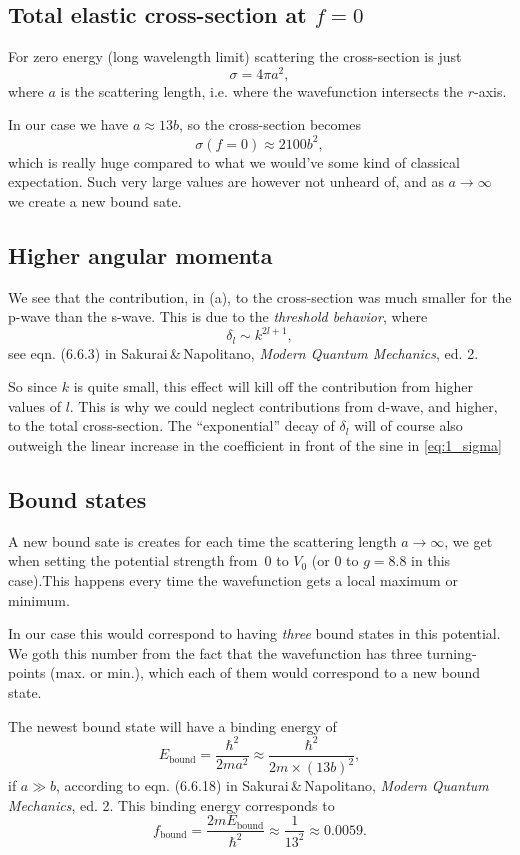 \documentclass[11pt,letter, swedish, english
]{article}
\begin{document}
\subsection{Total elastic cross-section at $f=0$}
For zero energy (long wavelength limit) scattering the cross-section
is just
\begin{equation}
\sigma=4\pi a^2,
\end{equation}
where $a$ is the scattering length, i.e. where the
wavefunction intersects the $r$-axis. 

In our case we have $a\approx 13b$, so the cross-section becomes
\begin{equation}
\sigma(f{=}0) \approx 2100b^2,
\end{equation}
which is really huge compared to what we would've some kind of
classical expectation. Such very large values are however not unheard
of, and as $a\to\infty$ we create a new bound sate.

\subsection{Higher angular momenta}
We see that the contribution, in (a), to the cross-section was much
smaller for the p-wave than the s-wave. This is due to the
\emph{threshold behavior}, where
\begin{equation}
\delta_l\sim k^{2l+1},
\end{equation}
see eqn. (6.6.3) in Sakurai\,\&\,Napolitano, \textit{Modern
  Quantum Mechanics}, ed. 2. 

So since $k$ is quite small, this effect will kill off the
contribution from higher values of $l$. This is why we could neglect
contributions from d-wave, and higher, to the total cross-section. The
``exponential'' decay of $\delta_l$ will of course also outweigh the
linear increase in the coefficient in front of the sine in
\eqref{eq:1_sigma} 


\subsection{Bound states}
A new bound sate is creates for each time the scattering length
$a\to\infty$, we get when setting the potential strength from~0 to
$V_0$ (or 0 to $g=8.8$ in this case).This happens every time the
wavefunction gets a local maximum or minimum. 

In our case this would correspond to having \emph{three} bound states
in this potential. We goth this number from the fact that the
wavefunction has three turning-points (max. or min.), which each of
them would correspond to a new bound state.


The newest bound state will have a binding energy of
\begin{equation}
E_\text{bound}=\frac{\hbar^2}{2ma^2}\approx\frac{\hbar^2}{2m\times (13b)^2},
\end{equation}
if $a\gg b$,
according to eqn. (6.6.18) in Sakurai\,\&\,Napolitano, \textit{Modern
  Quantum Mechanics}, ed. 2.
This binding energy corresponds to 
\begin{equation}
f_\text{bound} = \frac{2mE_\text{bound}}{\hbar^2}
\approx \frac{1}{13^2} \approx 0.0059.
\end{equation}
\end{document}
